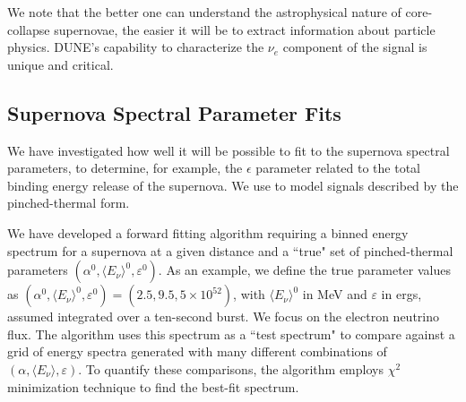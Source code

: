 We note that the better one can understand the astrophysical nature of core-collapse supernovae, the easier it will be to extract information about particle physics.  DUNE's capability to characterize the $\nu_e$ component of the signal is unique and critical.

\subsection{Supernova Spectral Parameter Fits}


We have investigated how well it will be possible to fit to the supernova
spectral parameters, to determine, for example, the $\epsilon$
parameter related to the total binding energy release of the supernova.  We 
use   to model signals described by the pinched-thermal form.

We have developed a
forward fitting algorithm requiring a   binned energy
spectrum for a supernova at a given distance and a ``true" set of
pinched-thermal parameters $(\alpha^0, \langle E_\nu \rangle^0,
\varepsilon^0)$. As an example, we define the true parameter values as
$(\alpha^0, \langle E_\nu \rangle^0, \varepsilon^0) = (2.5, 9.5,
5\times 10^{52})$, with  $\langle E_\nu \rangle^0$ in MeV and $\varepsilon$ in ergs, assumed
integrated over a ten-second burst.
We focus on the electron neutrino flux. The algorithm uses this
spectrum as a ``test spectrum" to compare against a grid of energy
spectra generated with many different combinations of $(\alpha,
\langle E_\nu \rangle, \varepsilon)$. To quantify these comparisons,
the algorithm employs $\chi^2$ minimization technique to find the
best-fit spectrum.




